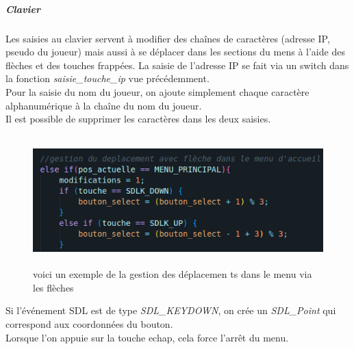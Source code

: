 \documentclass[11pt]{article}
\begin{document}
                    \subparagraph{Clavier}\leavevmode\newline
                    Les saisies au clavier servent à modifier des chaînes de caractères (adresse IP, pseudo du joueur) mais aussi à se déplacer dans les sections du mens à l’aide des flèches et des touches frappées. La saisie de l’adresse IP se fait via un switch dans la fonction \textit{saisie\_touche\_ip} vue précédemment. \\
                    Pour la saisie du nom du joueur, on ajoute simplement chaque caractère alphanumérique à la chaîne du nom du joueur. \\
                    Il est possible de supprimer les caractères dans les deux saisies.\\

                    \begin{figure}[H]
                        \centering
                        \includegraphics[height=5cm]{codeMenu.png}
                        \caption{voici un exemple de la gestion des déplacemen ts dans le menu via les flèches}
                        \label{fig:codeMenu}
                    \end{figure}
                    Si l’événement SDL est de type \textit{SDL\_KEYDOWN}, on crée un \textit{SDL\_Point} qui correspond aux coordonnées du bouton. \\
                    Lorsque l’on appuie sur la touche echap, cela force l’arrêt du menu.
\end{document}
